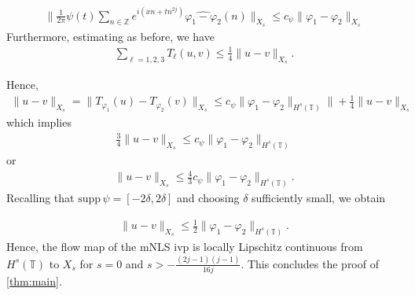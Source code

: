 \documentclass[handout]{beamer}
\numberwithin{equation}{section}
\newcommand{\zz}{\mathbb{Z}}
\newcommand{\ci}{\mathbb{T}}
\newcommand{\wh}{\widehat}
\newcommand{\vp}{\varphi}
\begin{document}
\begin{frame}

\begin{equation*}
	\begin{split}
		\| \frac{1}{2\pi} \psi(t) \sum_{n \in
		\zz}e^{i\left( xn + tn^{2j} \right)} \wh{\vp_1 - \vp_2}(n)\|_{X_s}
		\le c_\psi \|\vp_{1} - \vp_{2}\|_{X_s} 
	\end{split}
\end{equation*}
%
%
Furthermore, estimating as before, we have
%
%
\begin{equation*}
	\begin{split}
		\sum_{\ell=1,2,3} T_{\ell}(u,v) \le \frac{1}{4}\|u-v\|_{X_s}.
	\end{split}
\end{equation*}
%
%
\end{frame}

\begin{frame}

Hence,
%
%
\begin{equation*}
	\begin{split}
		\|u -v \|_{X_s} = \|T_{\vp_1}(u) - T_{\vp_2}(v) \|_{X_s} \le c_\psi
		\|\vp_{1} - \vp_{2} \|_{H^{s}\left( \ci \right)}\| +
		\frac{1}{4} \|u -v \|_{X_s}
	\end{split}
\end{equation*}
%
%
which implies
%
%
\begin{equation*}
	\begin{split}
		\frac{3}{4} \|u-v\|_{X_s} \le c_\psi \|\vp_1 - \vp_2 \|_{H^s(\ci)}
	\end{split}
\end{equation*}
%
%
or
%
%
\begin{equation*}
	\begin{split}
		\|u -v \|_{X_s} \le \frac{4}{3} c_\psi \|\vp_1 - \vp_2 \|_{H^{s}(\ci)}.
	\end{split}
\end{equation*}
%
%
Recalling that $\text{supp} \, \psi = [-2\delta, 2\delta ]$ and choosing
$\delta$ sufficiently small, we obtain

\end{frame}

\begin{frame}
%
%
\begin{equation*}
	\begin{split}
		\|u -v \|_{X_s} \le \frac{1}{2} \|\vp_1 - \vp_2 \|_{H^{s}(\ci)}.
	\end{split}
\end{equation*}
%
%
Hence, the flow map of the mNLS ivp is locally Lipschitz continuous from
$H^s(\ci)$ to $X_s$ for $s=0$ and $s > - \frac{(2j -1)(j-1)}{16j}$. This
concludes the proof of \autoref{thm:main}. \qquad \qedsymbol

\end{frame}
\end{document}
